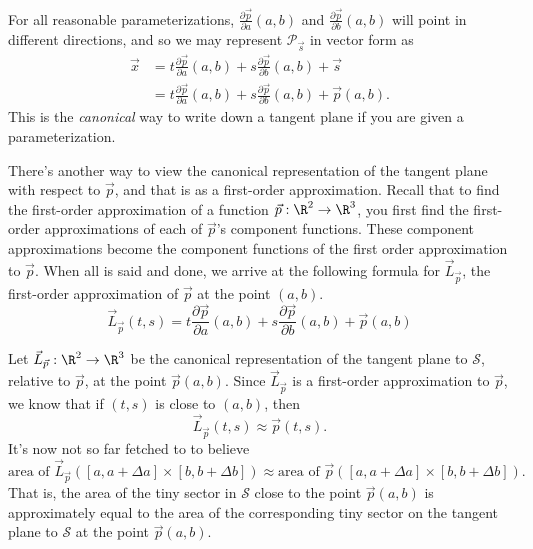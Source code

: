 For all reasonable parameterizations, $\frac{\partial \vec p}{\partial a}(a,b)$ and $\frac{\partial \vec p}{\partial b}(a,b)$
will point in different directions, and so we may represent $\mathcal P_{\vec s}$ in vector form as
	\begin{align*}
		\vec x &= t \frac{\partial \vec p}{\partial a}(a,b) + s\frac{\partial \vec p}{\partial b}(a,b)
		+\vec s\\
		&= t \frac{\partial \vec p}{\partial a}(a,b) + s\frac{\partial \vec p}{\partial b}(a,b)
		+\vec p(a,b).
	\end{align*}
This is the \emph{canonical} way to write down a tangent plane if you are given a parameterization.


There's another way to view the canonical representation of the tangent plane with respect to $\vec p$,
and that is as a first-order approximation.  Recall that to find the first-order approximation
of a function $\vec p:\R^2\to\R^3$, you first find the first-order approximations of each of $\vec p$'s
component functions.  These component approximations become the component functions
of the first order approximation to $\vec p$.  When all is said and done, we arrive at the following
formula for $\vec L_{\vec p}$, the first-order approximation of $\vec p$ at the point $(a,b)$.
\[
	\vec L_{\vec p}(t,s) = t \frac{\partial \vec p}{\partial a}(a,b) + s\frac{\partial \vec p}{\partial b}(a,b)
		+\vec p(a,b)
\]

Let $\vec L_{\vec p}:\R^2\to\R^3$ be the canonical representation of the tangent plane to $\mathcal S$,
relative to $\vec p$, at the point $\vec p(a,b)$.  Since $\vec L_{\vec p}$ is a first-order
approximation to $\vec p$, we know that if $(t,s)$ is close to $(a,b)$, then
\[
	\vec L_{\vec p}(t,s)\approx \vec p(t,s).
\]
It's now not so far fetched to to believe
\[
	\text{area of }\vec L_{\vec p}([a,a+\Delta a]\times [b,b+\Delta b]) \approx
	\text{area of }\vec p([a,a+\Delta a]\times [b,b+\Delta b]).
\]
That is, the area of the tiny sector in $\mathcal S$ close to the point $\vec p(a,b)$
is approximately equal to the area of the corresponding
tiny sector on the tangent plane to $\mathcal S$ at the point $\vec p(a,b)$.

